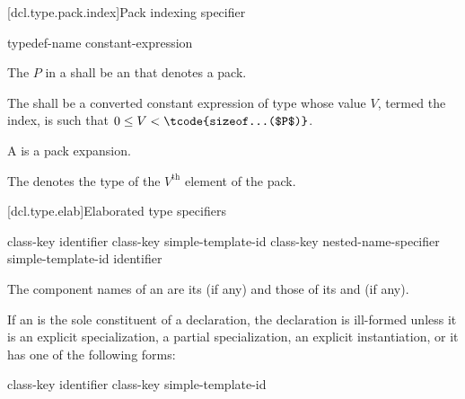 [dcl.type.pack.index]{Pack indexing specifier}

\begin{bnf}
\br
    typedef-name  \terminal{[} constant-expression \terminal{]}
\end{bnf}

\pnum
The  $P$ in a 
shall be an  that denotes a pack.

\pnum
The  shall be
a converted constant expression of type 
whose value $V$, termed the index,
is such that $0 \le V < \tcode{sizeof...($P$)}$.

\pnum
A  is a pack expansion.

\pnum
\begin{note}
The  denotes
the type of the $V^\text{th}$ element of the pack.
\end{note}

[dcl.type.elab]{Elaborated type specifiers}%
%
%

\begin{bnf}
\br
    class-key   identifier\br
    class-key simple-template-id\br
    class-key nested-name-specifier  simple-template-id\br
      identifier
\end{bnf}

\pnum
{}%
The component names of an  are
its  (if any) and
those of its  and
 (if any).

\pnum
{}%
%
If an  is the sole constituent of a
declaration, the declaration is ill-formed unless it is an explicit
specialization,
a partial specialization,
an explicit
instantiation, or it has one of the following
forms:

\begin{ncsimplebnf}
class-key  identifier \terminal{;}\br
class-key  simple-template-id \terminal{;}
\end{ncsimplebnf}


